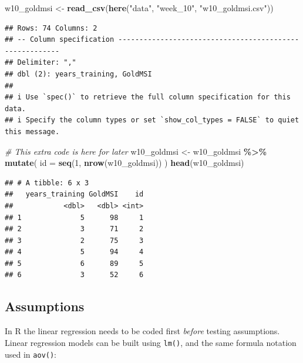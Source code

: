 \documentclass[
]{book}
\newenvironment{Shaded}{\begin{snugshade}}{\end{snugshade}}
\newcommand{\AttributeTok}[1]{\textcolor[rgb]{0.13,0.29,0.53}{#1}}
\newcommand{\CommentTok}[1]{\textcolor[rgb]{0.56,0.35,0.01}{\textit{#1}}}
\newcommand{\DecValTok}[1]{\textcolor[rgb]{0.00,0.00,0.81}{#1}}
\newcommand{\FunctionTok}[1]{\textcolor[rgb]{0.13,0.29,0.53}{\textbf{#1}}}
\newcommand{\NormalTok}[1]{#1}
\newcommand{\OtherTok}[1]{\textcolor[rgb]{0.56,0.35,0.01}{#1}}
\newcommand{\SpecialCharTok}[1]{\textcolor[rgb]{0.81,0.36,0.00}{\textbf{#1}}}
\newcommand{\StringTok}[1]{\textcolor[rgb]{0.31,0.60,0.02}{#1}}
\begin{document}
\begin{Shaded}
\begin{Highlighting}[]
\NormalTok{w10\_goldmsi }\OtherTok{\textless{}{-}} \FunctionTok{read\_csv}\NormalTok{(}\FunctionTok{here}\NormalTok{(}\StringTok{"data"}\NormalTok{, }\StringTok{"week\_10"}\NormalTok{, }\StringTok{"w10\_goldmsi.csv"}\NormalTok{)) }
\end{Highlighting}
\end{Shaded}

\begin{verbatim}
## Rows: 74 Columns: 2
## -- Column specification --------------------------------------------------------
## Delimiter: ","
## dbl (2): years_training, GoldMSI
## 
## i Use `spec()` to retrieve the full column specification for this data.
## i Specify the column types or set `show_col_types = FALSE` to quiet this message.
\end{verbatim}

\begin{Shaded}
\begin{Highlighting}[]
\CommentTok{\# This extra code is here for later}
\NormalTok{w10\_goldmsi }\OtherTok{\textless{}{-}}\NormalTok{ w10\_goldmsi }\SpecialCharTok{\%\textgreater{}\%}
    \FunctionTok{mutate}\NormalTok{(}
    \AttributeTok{id =} \FunctionTok{seq}\NormalTok{(}\DecValTok{1}\NormalTok{, }\FunctionTok{nrow}\NormalTok{(w10\_goldmsi))}
\NormalTok{  ) }
\FunctionTok{head}\NormalTok{(w10\_goldmsi)}
\end{Highlighting}
\end{Shaded}

\begin{verbatim}
## # A tibble: 6 x 3
##   years_training GoldMSI    id
##            <dbl>   <dbl> <int>
## 1              5      98     1
## 2              3      71     2
## 3              2      75     3
## 4              5      94     4
## 5              6      89     5
## 6              3      52     6
\end{verbatim}

\hypertarget{assumptions}{%
\subsection{Assumptions}\label{assumptions}}

In R the linear regression needs to be coded first \emph{before} testing assumptions. Linear regression models can be built using \texttt{lm()}, and the same formula notation used in \texttt{aov()}:
\end{document}
